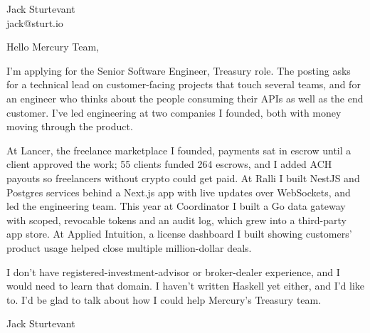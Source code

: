 \documentclass[11pt]{article}
\begin{document}
\raggedright

{\namefont\fontsize{20pt}{24pt}\selectfont Jack Sturtevant}\\[-0.3em]
jack@sturt.io

\vspace{1.2em}

Hello Mercury Team,

I'm applying for the Senior Software Engineer, Treasury role. The posting asks for a technical lead on customer-facing projects that touch several teams, and for an engineer who thinks about the people consuming their APIs as well as the end customer. I've led engineering at two companies I founded, both with money moving through the product.

At Lancer, the freelance marketplace I founded, payments sat in escrow until a client approved the work; 55 clients funded 264 escrows, and I added ACH payouts so freelancers without crypto could get paid. At Ralli I built NestJS and Postgres services behind a Next.js app with live updates over WebSockets, and led the engineering team. This year at Coordinator I built a Go data gateway with scoped, revocable tokens and an audit log, which grew into a third-party app store. At Applied Intuition, a license dashboard I built showing customers' product usage helped close multiple million-dollar deals.

I don't have registered-investment-advisor or broker-dealer experience, and I would need to learn that domain. I haven't written Haskell yet either, and I'd like to. I'd be glad to talk about how I could help Mercury's Treasury team.

\vspace{0.6em}
Jack Sturtevant
\end{document}
